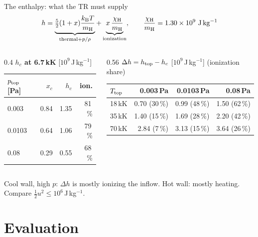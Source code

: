 \documentclass[aspectratio=169,10pt]{beamer}
\newcommand{\ptop}{p_{\rm top}}
\newcommand{\Ttop}{T_{\rm top}}
\newcommand{\htop}{h_{\rm top}}
\newcommand{\kB}{k_{\rm B}}
\newcommand{\mH}{m_{\rm H}}
\newcommand{\chiH}{\chi_{\rm H}}
\begin{document}
\begin{frame}{The enthalpy: what the TR must supply}
  \[
    h = \underbrace{\tfrac52(1+x)\frac{\kB T}{\mH}}_{\text{thermal}+p/\rho}
      + \underbrace{x\,\frac{\chiH}{\mH}}_{\text{ionization}},
    \qquad \frac{\chiH}{\mH} = 1.30\times10^{9}\ \mathrm{J\,kg^{-1}}
  \]
  \vspace{2pt}
  \begin{columns}[T]
    \begin{column}{0.4\textwidth}
      \small
      \textbf{$h_c$ at 6.7\,kK} [$10^9$\,J\,kg$^{-1}$]\\[3pt]
      \begin{tabular}{@{}lrrr@{}}
        \toprule
        $\ptop$ [Pa] & $x_c$ & $h_c$ & ion. \\
        \midrule
        0.003 & 0.84 & 1.35 & 81\,\% \\
        0.0103 & 0.64 & 1.06 & 79\,\% \\
        0.08 & 0.29 & 0.55 & 68\,\% \\
        \bottomrule
      \end{tabular}
    \end{column}
    \begin{column}{0.56\textwidth}
      \small
      \textbf{$\Delta h = \htop - h_c$} [$10^9$\,J\,kg$^{-1}$] (ionization share)\\[3pt]
      \begin{tabular}{@{}lrrr@{}}
        \toprule
        $\Ttop$ & 0.003\,Pa & 0.0103\,Pa & 0.08\,Pa \\
        \midrule
        18\,kK & 0.70 (30\,\%) & 0.99 (48\,\%) & 1.50 (62\,\%) \\
        35\,kK & 1.40 (15\,\%) & 1.69 (28\,\%) & 2.20 (42\,\%) \\
        70\,kK & 2.84 (7\,\%) & 3.13 (15\,\%) & 3.64 (26\,\%) \\
        \bottomrule
      \end{tabular}
    \end{column}
  \end{columns}
  \vspace{8pt}
  \small Cool wall, high $p$: $\Delta h$ is mostly ionizing the inflow.
  Hot wall: mostly heating. Compare $\tfrac12u^2 \leq 10^{6}$\,J\,kg$^{-1}$.
\end{frame}

\section{Evaluation}
\end{document}
